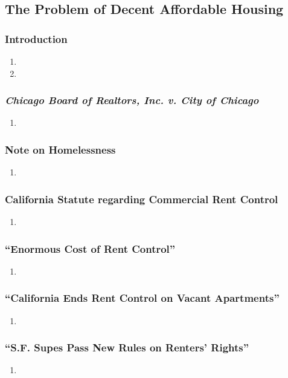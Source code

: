 \subsection{The Problem of Decent Affordable Housing}

\subsubsection{Introduction} %

\begin{enumerate}
    \item %
    \item %
\end{enumerate}

\subsubsection{\emph{Chicago Board of Realtors, Inc. v. City of Chicago}}

\begin{enumerate}
    \item 
\end{enumerate}

\subsubsection{Note on Homelessness}

\begin{enumerate}
    \item 
\end{enumerate}

\subsubsection{California Statute regarding Commercial Rent Control}

\begin{enumerate}
    \item 
\end{enumerate}

\subsubsection{``Enormous Cost of Rent Control''}

\begin{enumerate}
    \item 
\end{enumerate}

\subsubsection{``California Ends Rent Control on Vacant Apartments''}

\begin{enumerate}
    \item 
\end{enumerate}

\subsubsection{``S.F. Supes Pass New Rules on Renters' Rights''}

\begin{enumerate}
    \item 
\end{enumerate}
